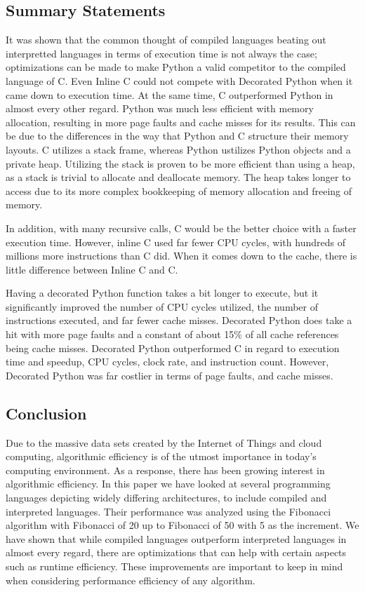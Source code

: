 \documentclass{sig-alternate}
\begin{document}
\subsection{Summary Statements}

It was shown that the common thought of compiled languages beating out interpretted languages in terms of execution time is not always the case; optimizations can be made to make Python a valid competitor to the compiled language of C. Even Inline C could not compete with Decorated Python when it came down to execution time. At the same time, C outperformed Python in almost every other regard. Python was much less efficient with memory allocation, resulting in more page faults and cache misses for its results. This can be due to the differences in the way that Python and C structure their memory layouts. C utilizes a stack frame, whereas Python ustilizes Python objects and a private heap. Utilizing the stack is proven to be more efficient than using a heap, as a stack is trivial to allocate and deallocate memory. The heap takes longer to access due to its more complex bookkeeping of memory allocation and freeing of memory.

In addition, with many recursive calls, C would be the better choice with a faster execution time. However, inline C used far fewer CPU cycles, with hundreds of millions more instructions than C did. When it comes down to the cache, there is little difference between Inline C and C.

Having a decorated Python function takes a bit longer to execute, but it significantly improved the number of CPU cycles utilized, the number of instructions executed, and far fewer cache misses. Decorated Python does take a hit with more page faults and a constant of about 15\% of all cache references being cache misses. Decorated Python outperformed C in regard to execution time and speedup, CPU cycles, clock rate, and instruction count. However, Decorated Python was far costlier in terms of page faults, and cache misses.

\subsection{Conclusion}

Due to the massive data sets created by the Internet of Things and cloud computing, algorithmic efficiency is of the utmost importance in today's computing environment. As a response, there has been growing interest in algorithmic efficiency. In this paper we have looked at several programming languages depicting widely differing architectures, to include compiled and interpreted languages. Their performance was analyzed using the Fibonacci algorithm with Fibonacci of 20 up to Fibonacci of 50 with 5 as the increment. We have shown that while compiled languages outperform interpreted languages in almost every regard, there are optimizations that can help with certain aspects such as runtime efficiency. These improvements are important to keep in mind when considering performance efficiency of any algorithm.
\end{document}
